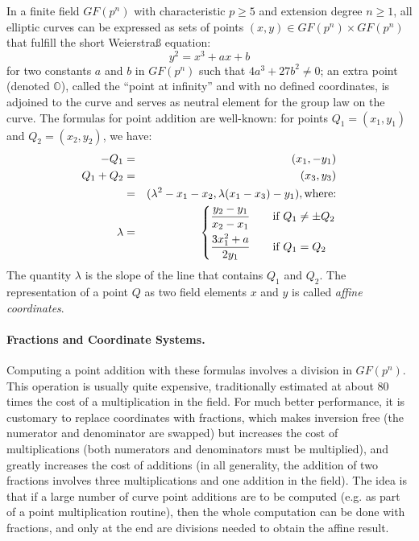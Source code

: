 \documentclass{llncs}
\newcommand{\GF}{GF}
\newcommand{\neutral}{\mathbb{O}}
\begin{document}
In a finite field $\GF(p^n)$ with characteristic $p \ge 5$ and extension
degree $n\ge 1$, all elliptic curves can be expressed as sets of points
$(x,y) \in \GF(p^n)\times\GF(p^n)$ that fulfill the short Weierstraß
equation:
\begin{equation*}
    y^2 = x^3 + ax + b
\end{equation*}
for two constants $a$ and $b$ in $\GF(p^n)$ such that $4a^3 + 27b^2 \neq
0$; an extra point (denoted $\neutral$), called the ``point at
infinity'' and with no defined coordinates, is adjoined to the curve and
serves as neutral element for the group law on the curve. The formulas
for point addition are well-known: for points $Q_1 = (x_1, y_1)$ and
$Q_2 = (x_2, y_2)$, we have:
\begin{eqnarray*}
    - Q_1 &=& (x_1, -y_1) \\
    Q_1 + Q_2 &=& (x_3, y_3) \\
              &=& (\lambda^2 - x_1 - x_2, \lambda (x_1 - x_3) - y_1), \mathrm{where{:}} \\
    \lambda &=& \begin{dcases}
        \frac{y_2 - y_1}{x_2 - x_1} & \quad\text{if $Q_1 \neq \pm Q_2$} \\
        \frac{3x_1^2 + a}{2y_1} & \quad\text{if $Q_1 = Q_2$} \\
    \end{dcases}\\
\end{eqnarray*}
The quantity $\lambda$ is the slope of the line that contains $Q_1$ and
$Q_2$. The representation of a point $Q$ as two field elements $x$ and
$y$ is called \emph{affine coordinates}.

\paragraph{Fractions and Coordinate Systems.}

Computing a point addition with these formulas involves a division in
$\GF(p^n)$. This operation is usually quite expensive, traditionally
estimated at about 80 times the cost of a multiplication in the field.
For much better performance, it is customary to replace coordinates with
fractions, which makes inversion free (the numerator and denominator are
swapped) but increases the cost of multiplications (both numerators and
denominators must be multiplied), and greatly increases the cost of
additions (in all generality, the addition of two fractions involves
three multiplications and one addition in the field). The idea is that
if a large number of curve point additions are to be computed (e.g. as
part of a point multiplication routine), then the whole computation can
be done with fractions, and only at the end are divisions needed to
obtain the affine result.
\end{document}
